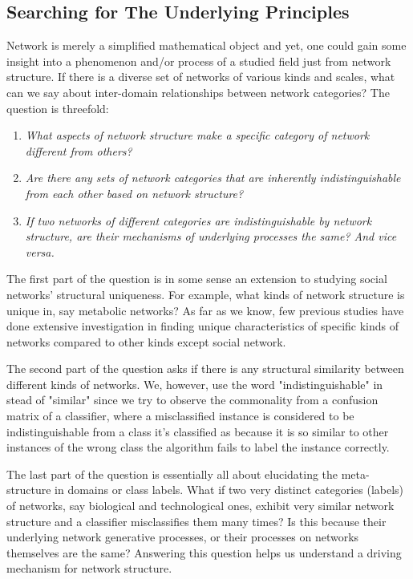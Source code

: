 \documentclass{article}
\begin{document}
	\subsection{Searching for The Underlying Principles}
Network is merely a simplified mathematical object and yet, one could gain some insight into a phenomenon and/or process of a studied field just from network structure. 
If there is a diverse set of networks of various kinds and scales, what can we say about inter-domain relationships between network categories? The question is threefold: 
\begin{enumerate}
	\item \textit{What aspects of network structure make a specific category of network different from others?}
	\item \textit{Are there any sets of network categories that are inherently indistinguishable from each other based on network structure?} 
	\item \textit{If two networks of different categories are indistinguishable by network structure, are their mechanisms of underlying processes the same? And vice versa.}
\end{enumerate}

The first part of the question is in some sense an extension to studying social networks' structural uniqueness. For example, what kinds of network structure is unique in, say metabolic networks? As far as we know, few previous studies have done extensive investigation in finding unique characteristics of specific kinds of networks compared to other kinds except social network.

The second part of the question asks if there is any structural similarity between different kinds of networks. We, however, use the word "indistinguishable" in stead of "similar" since we try to observe the commonality from a confusion matrix of a classifier, where a misclassified instance is considered to be indistinguishable from a class it's classified as because it is so similar to other instances of the wrong class the algorithm fails to label the instance correctly.


The last part of the question is essentially all about elucidating the meta-structure in domains or class labels. What if two very distinct categories (labels) of networks, say biological and technological ones, exhibit very similar network structure and a classifier misclassifies them many times? Is this because their underlying network generative processes, or their processes on networks themselves are the same? Answering this question helps us understand a driving mechanism for network structure.
\end{document}
